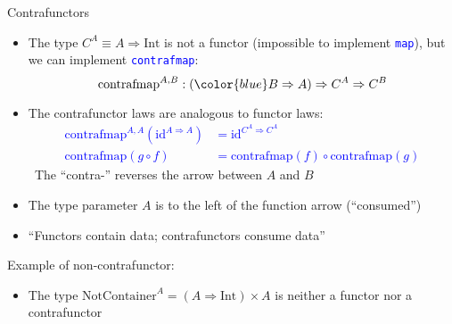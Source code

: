 \documentclass[english]{beamer}
\begin{document}
\begin{frame}{Contrafunctors}

\begin{itemize}
\item The type  $C^{A}\equiv A\Rightarrow\text{Int}$ is not a functor (impossible
to implement \texttt{\textcolor{blue}{\footnotesize{}map}}), but we
can implement \texttt{\textcolor{blue}{\footnotesize{}contrafmap}}:
\[
\text{contrafmap}^{A,B}:\left({\color{blue}B\Rightarrow A}\right)\Rightarrow C^{A}\Rightarrow C^{B}
\]
\item The contrafunctor laws are analogous to functor laws:\texttt{\textcolor{blue}{\footnotesize{}
\begin{align*}
\text{contrafmap}^{A,A}(\text{id}^{A\Rightarrow A}) & =\text{id}^{C^{A}\Rightarrow C^{A}}\\
\text{contrafmap}\left(g\circ f\right) & =\text{contrafmap}\left(f\right)\circ\text{contrafmap}\left(g\right)
\end{align*}
}}The ``contra-'' reverses the arrow between $A$ and $B$
\item The type parameter $A$ is to the left of the function arrow (``consumed'')
\item ``Functors contain data; contrafunctors consume data''
\end{itemize}
Example of non-contrafunctor:
\begin{itemize}
\item The type $\text{NotContainer}^{A}=\left(A\Rightarrow\text{Int}\right)\times A$
is neither a functor nor a contrafunctor
\end{itemize}
\end{frame}
\end{document}
